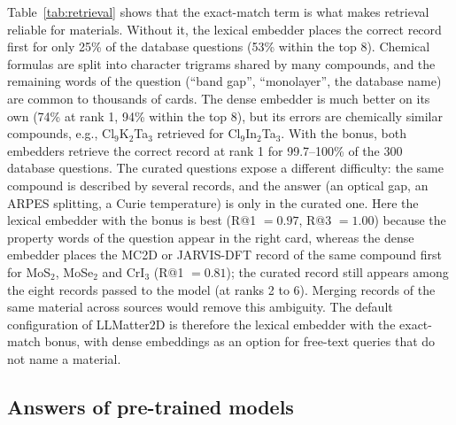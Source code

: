 \documentclass[prmaterials,twocolumn,superscriptaddress,longbibliography,nofootinbib]{revtex4-2}
\begin{document}
Table~\ref{tab:retrieval} shows that the exact-match term is what makes retrieval reliable
for materials. Without it, the lexical embedder places the correct record first for only
25\% of the database questions (53\% within the top 8). Chemical formulas are split into
character trigrams shared by many compounds, and the remaining words of the question
(``band gap'', ``monolayer'', the database name) are common to thousands of cards. The dense
embedder is much better on its own (74\% at rank 1, 94\% within the top 8), but its errors are
chemically similar compounds, e.g., Cl$_9$K$_2$Ta$_3$ retrieved for Cl$_9$In$_2$Ta$_3$. With
the bonus, both embedders retrieve the correct record at rank 1 for 99.7--100\% of the 300
database questions. The curated questions expose a different difficulty: the same compound
is described by several records, and the answer (an optical gap, an ARPES splitting, a Curie
temperature) is only in the curated one. Here the lexical embedder with the bonus is best
(R@1 $=0.97$, R@3 $=1.00$) because the property words of the question appear in the right
card, whereas the dense embedder places the MC2D or JARVIS-DFT record of the same compound
first for MoS$_2$, MoSe$_2$ and CrI$_3$ (R@1 $=0.81$); the curated record still appears among
the eight records passed to the model (at ranks 2 to 6). Merging records of the same material across sources
would remove this ambiguity. The default configuration of LLMatter2D is therefore the lexical
embedder with the exact-match bonus, with dense embeddings as an option for free-text queries
that do not name a material.

\subsection{Answers of pre-trained models}
\label{sec:answers}

\begin{table}[t]
\caption{Accuracy (\%) of pre-trained models served by LM Studio on one NVIDIA RTX PRO
6000 Blackwell GPU (96~GB of VRAM), with retrieval (RAG) and without it (closed book), on the
25 curated and 300 database questions, graded on the first stated value; citation validity
and precision (\%) of the retrieval-augmented answers to the database questions; and number
of closed-book answers to the database questions that decline to answer. Retrieval: lexical
embedder with exact-match bonus, $k=8$, numbered citations; temperature 0.2. The curated
cells are means over three runs and the retrieval-augmented database cells means over two,
with the range over runs in parentheses where the runs differ; the closed-book database cells
are single runs.}
\label{tab:answers}
\footnotesize

\end{table}
\end{document}
